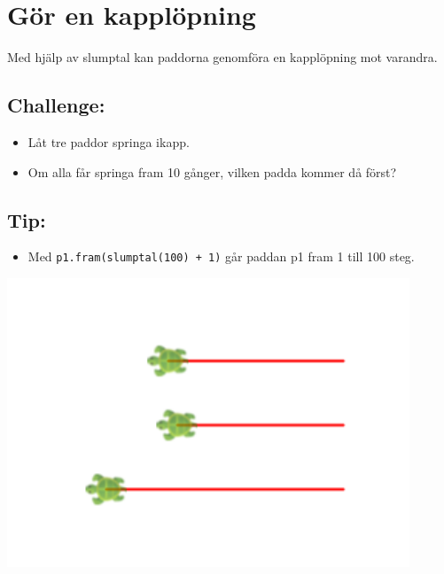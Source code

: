 \chapter{Gör en kapplöpning}
\begin{multicols}{2}
Med hjälp av slumptal kan paddorna genomföra en kapplöpning mot varandra.
\section*{\color{BrickRed}Challenge:}


\begin{itemize}

\item {Låt tre paddor springa ikapp.}
\item {Om alla får springa fram 10 gånger, vilken padda kommer då först?}

\end{itemize}


\section*{\color{OliveGreen}Tip:}


\begin{itemize}

\item {Med \lstinline{p1.fram(slumptal(100) + 1)} går paddan p1 fram 1 till 100 steg.}

\end{itemize}



\columnbreak

\begin{center}
\includegraphics[width=12.0cm]{../img/race.png}
\end{center}

\end{multicols}

